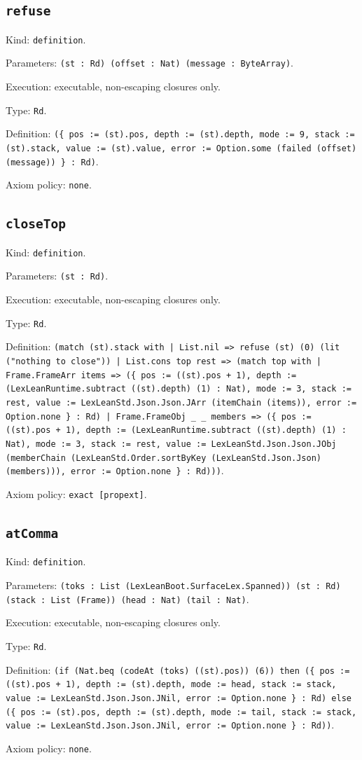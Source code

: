 \documentclass[11pt]{article}
\begin{document}
\subsection*{\texttt{refuse}}
\noindent Kind: \texttt{definition}.\par
\noindent Parameters: \texttt{(st : Rd) (offset : Nat) (message : ByteArray)}.\par
\noindent Execution: executable, non-escaping closures only.\par
\noindent Type: \texttt{Rd}.\par
\noindent Definition: \texttt{(\{ pos := (st).pos, depth := (st).depth, mode := 9, stack := (st).stack, value := (st).value, error := Option.some (failed (offset) (message)) \} : Rd)}.\par
\noindent Axiom policy: \texttt{none}.\par
\subsection*{\texttt{closeTop}}
\noindent Kind: \texttt{definition}.\par
\noindent Parameters: \texttt{(st : Rd)}.\par
\noindent Execution: executable, non-escaping closures only.\par
\noindent Type: \texttt{Rd}.\par
\noindent Definition: \texttt{(match (st).stack with | List.nil => refuse (st) (0) (lit ("nothing to close")) | List.cons top rest => (match top with | Frame.FrameArr items => (\{ pos := ((st).pos + 1), depth := (LexLeanRuntime.subtract ((st).depth) (1) : Nat), mode := 3, stack := rest, value := LexLeanStd.Json.Json.JArr (itemChain (items)), error := Option.none \} : Rd) | Frame.FrameObj \_ \_ members => (\{ pos := ((st).pos + 1), depth := (LexLeanRuntime.subtract ((st).depth) (1) : Nat), mode := 3, stack := rest, value := LexLeanStd.Json.Json.JObj (memberChain (LexLeanStd.Order.sortByKey (LexLeanStd.Json.Json) (members))), error := Option.none \} : Rd)))}.\par
\noindent Axiom policy: \texttt{exact [propext]}.\par
\subsection*{\texttt{atComma}}
\noindent Kind: \texttt{definition}.\par
\noindent Parameters: \texttt{(toks : List (LexLeanBoot.SurfaceLex.Spanned)) (st : Rd) (stack : List (Frame)) (head : Nat) (tail : Nat)}.\par
\noindent Execution: executable, non-escaping closures only.\par
\noindent Type: \texttt{Rd}.\par
\noindent Definition: \texttt{(if (Nat.beq (codeAt (toks) ((st).pos)) (6)) then (\{ pos := ((st).pos + 1), depth := (st).depth, mode := head, stack := stack, value := LexLeanStd.Json.Json.JNil, error := Option.none \} : Rd) else (\{ pos := (st).pos, depth := (st).depth, mode := tail, stack := stack, value := LexLeanStd.Json.Json.JNil, error := Option.none \} : Rd))}.\par
\noindent Axiom policy: \texttt{none}.\par
\end{document}
